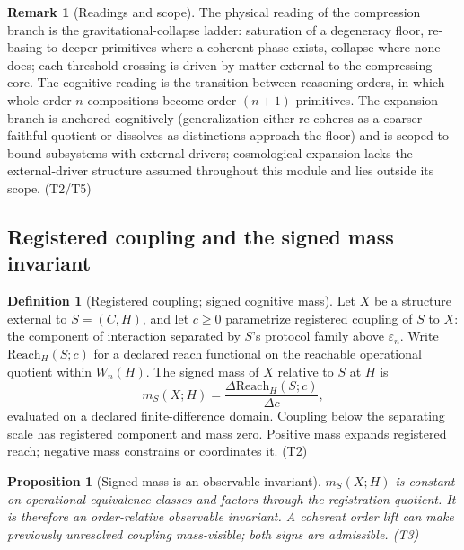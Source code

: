 \documentclass[11pt]{article}
\newtheorem{proposition}{Proposition}
\theoremstyle{definition}
\newtheorem{definition}{Definition}
\newtheorem{remark}{Remark}
\begin{document}
\begin{remark}[Readings and scope]
The physical reading of the compression branch is the gravitational-collapse ladder: saturation of a degeneracy floor, re-basing to deeper primitives where a coherent phase exists, collapse where none does; each threshold crossing is driven by matter external to the compressing core. The cognitive reading is the transition between reasoning orders, in which whole order-$n$ compositions become order-$(n+1)$ primitives. The expansion branch is anchored cognitively (generalization either re-coheres as a coarser faithful quotient or dissolves as distinctions approach the floor) and is scoped to bound subsystems with external drivers; cosmological expansion lacks the external-driver structure assumed throughout this module and lies outside its scope. (T2/T5)
\end{remark}

\subsection{Registered coupling and the signed mass invariant}

\begin{definition}[Registered coupling; signed cognitive mass]
Let $X$ be a structure external to $S = (C, H)$, and let $c \geq 0$ parametrize registered coupling of $S$ to $X$: the component of interaction separated by $S$'s protocol family above $\varepsilon_n$. Write $\mathrm{Reach}_H(S; c)$ for a declared reach functional on the reachable operational quotient within $W_n(H)$. The signed mass of $X$ relative to $S$ at $H$ is
\begin{equation}
m_S(X; H) = \frac{\Delta \mathrm{Reach}_H(S; c)}{\Delta c}, \tag{S45}
\end{equation}
evaluated on a declared finite-difference domain. Coupling below the separating scale has registered component and mass zero. Positive mass expands registered reach; negative mass constrains or coordinates it. (T2)
\end{definition}

\begin{proposition}[Signed mass is an observable invariant]
$m_S(X; H)$ is constant on operational equivalence classes and factors through the registration quotient. It is therefore an order-relative observable invariant. A coherent order lift can make previously unresolved coupling mass-visible; both signs are admissible. (T3)
\end{proposition}
\end{document}
